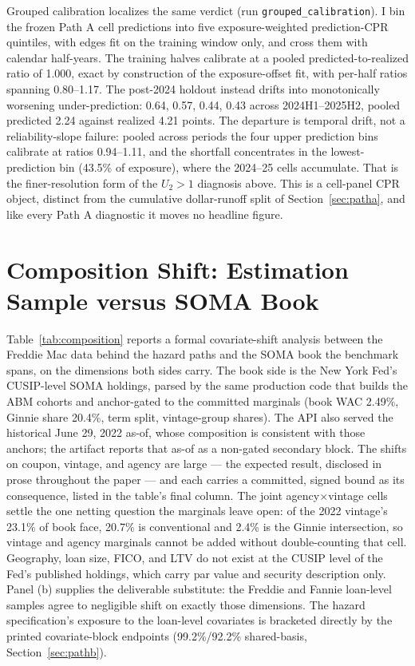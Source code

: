 \documentclass[12pt]{article}
\begin{document}
Grouped calibration localizes the same verdict (run \texttt{grouped\_calibration}). I bin the frozen Path A cell predictions into five exposure-weighted prediction-CPR quintiles, with edges fit on the training window only, and cross them with calendar half-years. The training halves calibrate at a pooled predicted-to-realized ratio of 1.000, exact by construction of the exposure-offset fit, with per-half ratios spanning 0.80--1.17. The post-2024 holdout instead drifts into monotonically worsening under-prediction: 0.64, 0.57, 0.44, 0.43 across 2024H1--2025H2, pooled predicted 2.24 against realized 4.21 points. The departure is temporal drift, not a reliability-slope failure: pooled across periods the four upper prediction bins calibrate at ratios 0.94--1.11, and the shortfall concentrates in the lowest-prediction bin (43.5\% of exposure), where the 2024--25 cells accumulate. That is the finer-resolution form of the $U_2 > 1$ diagnosis above. This is a cell-panel CPR object, distinct from the cumulative dollar-runoff split of Section~\ref{sec:patha}, and like every Path A diagnostic it moves no headline figure.

\section{Composition Shift: Estimation Sample versus SOMA Book}\label{app:composition}

Table~\ref{tab:composition} reports a formal covariate-shift analysis between the Freddie Mac data behind the hazard paths and the SOMA book the benchmark spans, on the dimensions both sides carry. The book side is the New York Fed's CUSIP-level SOMA holdings, parsed by the same production code that builds the ABM cohorts and anchor-gated to the committed marginals (book WAC 2.49\%, Ginnie share 20.4\%, term split, vintage-group shares). The API also served the historical June 29, 2022 as-of, whose composition is consistent with those anchors; the artifact reports that as-of as a non-gated secondary block. The shifts on coupon, vintage, and agency are large --- the expected result, disclosed in prose throughout the paper --- and each carries a committed, signed bound as its consequence, listed in the table's final column. The joint agency$\times$vintage cells settle the one netting question the marginals leave open: of the 2022 vintage's 23.1\% of book face, 20.7\% is conventional and 2.4\% is the Ginnie intersection, so vintage and agency marginals cannot be added without double-counting that cell. Geography, loan size, FICO, and LTV do not exist at the CUSIP level of the Fed's published holdings, which carry par value and security description only. Panel (b) supplies the deliverable substitute: the Freddie and Fannie loan-level samples agree to negligible shift on exactly those dimensions. The hazard specification's exposure to the loan-level covariates is bracketed directly by the printed covariate-block endpoints (99.2\%/92.2\% shared-basis, Section~\ref{sec:pathb}).
\end{document}
